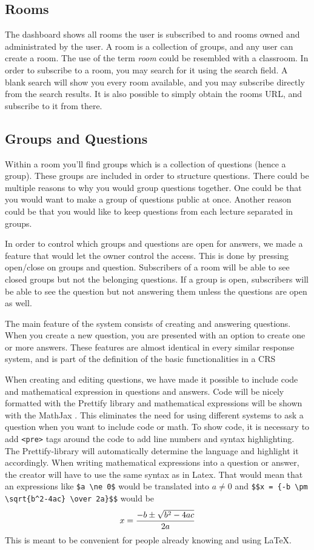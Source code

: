 \subsection{Rooms}
The dashboard shows all rooms the user is subscribed to and rooms owned and administrated by the user. A room is a collection of groups, and any user can create a room. The use of the term \emph{room} could be resembled with a classroom. In order to subscribe to a room, you may search for it using the search field. A blank search will show you every room available, and you may subscribe directly from the search results. It is also possible to simply obtain the rooms URL, and subscribe to it from there.

\subsection{Groups and Questions}
Within a room you'll find groups which is a collection of questions (hence a group). These groups are included in order to structure questions. There could be multiple reasons to why you would group questions together. One could be that you would want to make a group of questions public at once. Another reason could be that you would like to keep questions from each lecture separated in groups.

In order to control which groups and questions are open for answers, we made a feature that would let the owner control the access. This is done by pressing open/close on groups and question. Subscribers of a room will be able to see closed groups but not the belonging questions. If a group is open, subscribers will be able to see the question but not answering them unless the questions are open as well.

The main feature of the system consists of creating and answering questions. When you create a new question, you are presented with an option to create one or more answers.
These features are almost identical in every similar response system, and is part of the definition of the basic functionalities in a CRS 

When creating and editing questions, we have made it possible to include code and mathematical expression in questions and answers. Code will be nicely formatted with the Prettify library \cite{google/code-prettify_2016} and mathematical expressions will be shown with the MathJax \cite{mathjax_2016}. This eliminates the need for using different systems to ask a question when you want to include code or math. To show code, it is necessary to add \texttt{<pre>} tags around the code to add line numbers and syntax highlighting. The Prettify-library will automatically determine the language and highlight it accordingly. When writing mathematical expressions into a question or answer, the creator will have to use the same syntax as in Latex. That would mean that an expressions like \verb|$a \ne 0$| would be translated into $a \ne 0$ and \verb|$$x = {-b \pm \sqrt{b^2-4ac} \over 2a}$$| would be $$x = {-b \pm \sqrt{b^2-4ac} \over 2a}$$
This is meant to be convenient for people already knowing and using \LaTeX.

